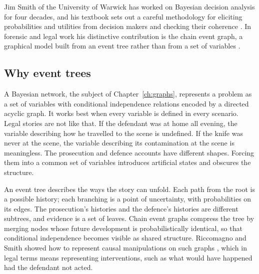 Jim Smith of the University of Warwick has worked on Bayesian decision analysis for four decades, and his textbook sets out a careful methodology for eliciting probabilities and utilities from decision makers and checking their coherence \citep{smith2010}. In forensic and legal work his distinctive contribution is the chain event graph, a graphical model built from an event tree rather than from a set of variables \citep{smith2008,collazo2018}.

\subsection{Why event trees}

A Bayesian network, the subject of Chapter~\ref{ch:graphs}, represents a problem as a set of variables with conditional independence relations encoded by a directed acyclic graph. It works best when every variable is defined in every scenario. Legal stories are not like that. If the defendant was at home all evening, the variable describing how he travelled to the scene is undefined. If the knife was never at the scene, the variable describing its contamination at the scene is meaningless. The prosecution and defence accounts have different shapes. Forcing them into a common set of variables introduces artificial states and obscures the structure.

An event tree describes the ways the story can unfold. Each path from the root is a possible history; each branching is a point of uncertainty, with probabilities on its edges. The prosecution's histories and the defence's histories are different subtrees, and evidence is a set of leaves. Chain event graphs compress the tree by merging nodes whose future development is probabilistically identical, so that conditional independence becomes visible as shared structure. Riccomagno and Smith showed how to represent causal manipulations on such graphs \citep{riccomagno2007}, which in legal terms means representing interventions, such as what would have happened had the defendant not acted.

